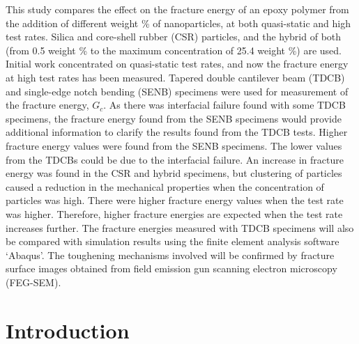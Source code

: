 \documentclass[numbers=noendperiod,chapterprefix=on]{icldt} %
\begin{document}
This study compares the effect on the fracture energy of an epoxy polymer from the addition of different weight \% of nanoparticles, at both quasi-static and high test rates. 
Silica and core-shell rubber (CSR) particles, and the hybrid of both (from 0.5 weight \% to the maximum concentration of 25.4 weight \%) are used. Initial work concentrated on quasi-static test rates, and now the fracture energy at high test rates has been measured. Tapered double cantilever beam (TDCB) and single-edge notch bending (SENB) specimens were used for measurement of the fracture energy, $G_c$. As there was interfacial failure found with some TDCB specimens, the fracture energy found from the SENB specimens would provide additional information to clarify the results found from the TDCB tests. Higher fracture energy values were found from the SENB specimens. The lower values from the TDCBs could be due to the interfacial failure. An increase in fracture energy was found in the CSR and hybrid specimens, but clustering of particles caused a reduction in the mechanical properties when the concentration of particles was high. There were higher fracture energy values when the test rate was higher. Therefore, higher fracture energies are expected when the test rate increases further.
The fracture energies measured with TDCB specimens will also be compared with simulation results using the finite element analysis software ‘Abaqus’. The toughening mechanisms involved will be confirmed by fracture surface images obtained from field emission gun scanning electron microscopy (FEG-SEM). 

\newpage
\tableofcontents
\newpage
\listoftables
\newpage
\listoffigures
\makenomenclature
\newpage
{}

\chapter{Introduction}

\printnomenclature[2cm]

\end{document}
